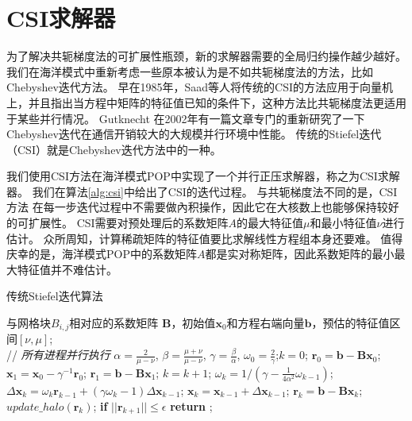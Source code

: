 
\section{CSI求解器}
\label{solver:csi}

为了解决共轭梯度法的可扩展性瓶颈，新的求解器需要的全局归约操作越少越好。 
我们在海洋模式中重新考虑一些原本被认为是不如共轭梯度法的方法，比如Chebyshev迭代方法。
早在1985年，Saad等人\cite{saad1985solving}将传统的CSI的方法应用于向量机上，并且指出当方程中矩阵的特征值已知的条件下，这种方法比共轭梯度法更适用于某些并行情况。  
Gutknecht \cite{gutknecht2002chebyshev} 在2002年有一篇文章专门的重新研究了一下Chebyshev迭代在通信开销较大的大规模并行环境中性能。 
传统的Stiefel迭代（CSI）就是Chebyshev迭代方法中的一种。 


我们使用CSI方法在海洋模式POP中实现了一个并行正压求解器，称之为CSI求解器。
我们在算法\ref{alg:csi}中给出了CSI的迭代过程。
与共轭梯度法不同的是，CSI方法 在每一步迭代过程中不需要做內积操作，因此它在大核数上也能够保持较好的可扩展性。
CSI需要对预处理后的系数矩阵$A$的最大特征值$\mu$和最小特征值$\nu$进行估计。 
众所周知，计算稀疏矩阵的特征值要比求解线性方程组本身还要难。 
值得庆幸的是，海洋模式POP中的系数矩阵$A$都是实对称矩阵，因此系数矩阵的最小最大特征值并不难估计。 
 
\begin{algorithm}[h]
\caption{传统Stiefel迭代算法}
\label{alg:csi}
\begin{algorithmic}[1]
\REQUIRE 与网格块$B_{i,j}$相对应的系数矩阵 $\textbf{B}$，初始值$\textbf{x}_0$和方程右端向量$\textbf{b}$，预估的特征值区间$[\nu,\mu]$;  \\
 // \qquad    \textit{所有进程并行执行}
\STATE $\alpha =\frac{2}{\mu -\nu}$, $ \beta = \frac{\mu +\nu}{\mu -\nu}$, $\gamma = \frac{\beta}{\alpha}$, $\omega_0 =\frac{ 2}{\gamma}$;\quad $k = 0$;
\STATE $\textbf{r}_0 = \textbf{b}-\textbf{B}\textbf{x}_0$; $\textbf{x}_1 =\textbf{x}_0 -\gamma^{-1}\textbf{r}_0$; $\textbf{r}_1 =\textbf{b} -\textbf{B}\textbf{x}_1$;
\STATE $k=k+1$;
\STATE $\omega_k = 1/(\gamma - \frac{1}{4\alpha^2}\omega_{k-1})$;  \label{AlgCsiIter}
\STATE $\Delta \textbf{x}_{k} =\omega_k\textbf{r}_{k-1}+(\gamma \omega_k-1)\Delta \textbf{x}_{k-1}$; \label{AlgCsiVec1}
\STATE $\textbf{x}_{k} =\textbf{x}_{k-1}+\Delta \textbf{x}_{k-1}$; \label{AlgCsiVec2}
\STATE $\textbf{r}_{k} =\textbf{b}- \textbf{B}\textbf{x}_{k}$;\label{AlgCsiVec3}
\STATE $update\_halo(\textbf{r}_k)$; \label{AlgCsiBound}
\STATE \textbf{if} $||\textbf{r}_{k+1}|| \le \epsilon$  \textbf{return} ;
\ENDIF\ENDWHILE
\end{algorithmic}
\end{algorithm}

